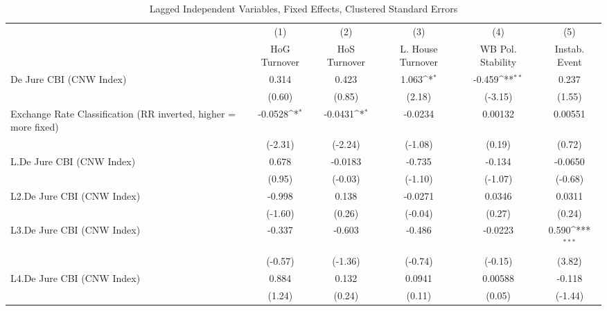 {
\def\sym#1{\ifmmode^{#1}\else\(^{#1}\)\fi}
\begin{longtable}{l*{5}{c}}
\caption{Lagged Independent Variables, Fixed Effects, Clustered Standard Errors \label{lagsDJ}}\\
\hline\hline\endfirsthead\hline\endhead\hline\endfoot\endlastfoot
                &\multicolumn{1}{c}{(1)}&\multicolumn{1}{c}{(2)}&\multicolumn{1}{c}{(3)}&\multicolumn{1}{c}{(4)}&\multicolumn{1}{c}{(5)}\\
                &\multicolumn{1}{c}{HoG Turnover}&\multicolumn{1}{c}{HoS Turnover}&\multicolumn{1}{c}{L. House Turnover}&\multicolumn{1}{c}{WB Pol. Stability}&\multicolumn{1}{c}{Instab. Event}\\
\hline
De Jure CBI (CNW Index)&    0.314         &    0.423         &    1.063\sym{*}  &   -0.459\sym{**} &    0.237         \\
                &   (0.60)         &   (0.85)         &   (2.18)         &  (-3.15)         &   (1.55)         \\
[1em]
Exchange Rate Classification (RR inverted, higher = more fixed)&  -0.0528\sym{*}  &  -0.0431\sym{*}  &  -0.0234         &  0.00132         &  0.00551         \\
                &  (-2.31)         &  (-2.24)         &  (-1.08)         &   (0.19)         &   (0.72)         \\
[1em]
L.De Jure CBI (CNW Index)&    0.678         &  -0.0183         &   -0.735         &   -0.134         &  -0.0650         \\
                &   (0.95)         &  (-0.03)         &  (-1.10)         &  (-1.07)         &  (-0.68)         \\
[1em]
L2.De Jure CBI (CNW Index)&   -0.998         &    0.138         &  -0.0271         &   0.0346         &   0.0311         \\
                &  (-1.60)         &   (0.26)         &  (-0.04)         &   (0.27)         &   (0.24)         \\
[1em]
L3.De Jure CBI (CNW Index)&   -0.337         &   -0.603         &   -0.486         &  -0.0223         &    0.590\sym{***}\\
                &  (-0.57)         &  (-1.36)         &  (-0.74)         &  (-0.15)         &   (3.82)         \\
[1em]
L4.De Jure CBI (CNW Index)&    0.884         &    0.132         &   0.0941         &  0.00588         &   -0.118         \\
                &   (1.24)         &   (0.24)         &   (0.11)         &   (0.05)         &  (-1.44)         \\

\end{longtable}}
